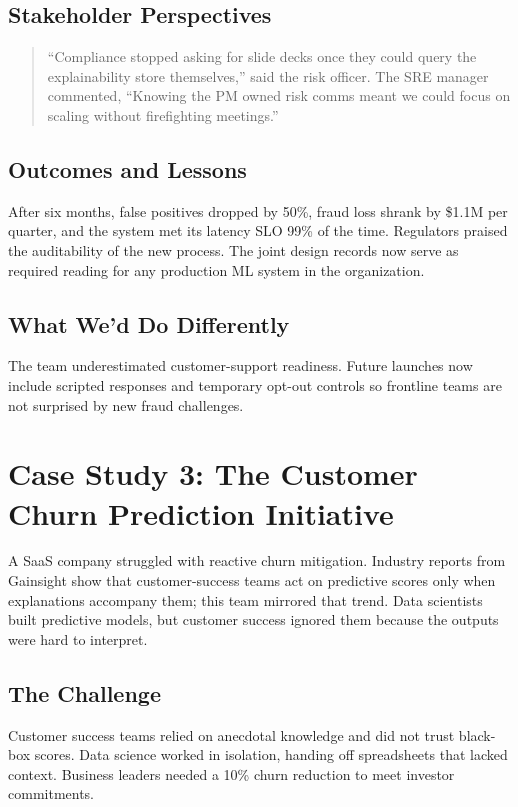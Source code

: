 \subsection{Stakeholder Perspectives}
\begin{quote}
``Compliance stopped asking for slide decks once they could query the explainability store themselves,'' said the risk officer. The SRE manager commented, ``Knowing the PM owned risk comms meant we could focus on scaling without firefighting meetings.''
\end{quote}

\subsection{Outcomes and Lessons}
After six months, false positives dropped by 50\%, fraud loss shrank by \$1.1M per quarter, and the system met its latency SLO 99\% of the time. Regulators praised the auditability of the new process. The joint design records now serve as required reading for any production ML system in the organization.

\subsection{What We'd Do Differently}
The team underestimated customer-support readiness. Future launches now include scripted responses and temporary opt-out controls so frontline teams are not surprised by new fraud challenges.

\section{Case Study 3: The Customer Churn Prediction Initiative}
\label{sec:case-churn}

A SaaS company struggled with reactive churn mitigation. Industry reports from Gainsight show that customer-success teams act on predictive scores only when explanations accompany them; this team mirrored that trend. Data scientists built predictive models, but customer success ignored them because the outputs were hard to interpret.

\subsection{The Challenge}
Customer success teams relied on anecdotal knowledge and did not trust black-box scores. Data science worked in isolation, handing off spreadsheets that lacked context. Business leaders needed a 10\% churn reduction to meet investor commitments.

